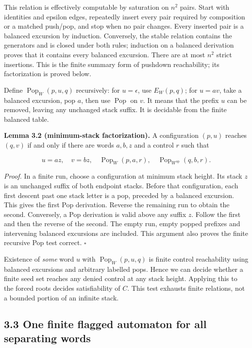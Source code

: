 \documentclass[
  11pt,
  a4paper,
]{article}
\begin{document}
This relation is effectively computable by saturation on \(n^2\) pairs.
Start with identities and epsilon edges, repeatedly insert every pair
required by composition or a matched push/pop, and stop when no pair
changes. Every inserted pair is a balanced excursion by induction.
Conversely, the stable relation contains the generators and is closed
under both rules; induction on a balanced derivation proves that it
contains every balanced excursion. There are at most \(n^2\) strict
insertions. This is the finite summary form of pushdown reachability;
its factorization is proved below.

Define \(\operatorname{Pop}_W(p,u,q)\) recursively: for \(u=\epsilon\),
use \(E_W(p,q)\); for \(u=av\), take a balanced excursion, pop \(a\),
then use \(\operatorname{Pop}\) on \(v\). It means that the prefix \(u\)
can be removed, leaving any unchanged stack suffix. It is decidable from
the finite balanced table.


\textbf{Lemma 3.2 (minimum-stack factorization).} A configuration
\((p,u)\) reaches \((q,v)\) if and only if there are words \(a,b,z\) and
a control \(r\) such that

\[u=az,\quad v=bz,\quad
\operatorname{Pop}_W(p,a,r),\quad
\operatorname{Pop}_{W^{\mathrm{op}}}(q,b,r).\tag{3.2}\]

\emph{Proof.} In a finite run, choose a configuration at minimum stack
height. Its stack \(z\) is an unchanged suffix of both endpoint stacks.
Before that configuration, each first descent past one stack letter is a
pop, preceded by a balanced excursion. This gives the first Pop
derivation. Reverse the remaining run to obtain the second. Conversely,
a Pop derivation is valid above any suffix \(z\). Follow the first and
then the reverse of the second. The empty run, empty popped prefixes and
intervening balanced excursions are included. This argument also proves
the finite recursive Pop test correct. \(\square\)

Existence of \emph{some} word \(u\) with \(\operatorname{Pop}_W(p,u,q)\)
is finite control reachability using balanced excursions and arbitrary
labelled pops. Hence we can decide whether a finite seed set reaches any
denied control at any stack height. Applying this to the forced roots
decides satisfiability of \(C\). This test exhausts finite relations,
not a bounded portion of an infinite stack.

\subsection{3.3 One finite flagged automaton for all separating
words}\label{one-finite-flagged-automaton-for-all-separating-words}
\end{document}
